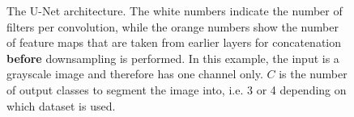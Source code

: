 \begin {figure}[!htb]
	\scalebox{0.75}{}
	\caption[The U-Net architecture.]{The U-Net architecture. The white numbers indicate the number of filters per convolution, while the orange numbers show the number of feature maps that are taken from earlier layers for concatenation \textbf{before} downsampling is performed. In this example, the input is a grayscale image and therefore has one channel only. $C$ is the number of output classes to segment the image into, i.e. 3 or 4 depending on which dataset is used.}
	\label{fig:unet_arch}
\end {figure}
